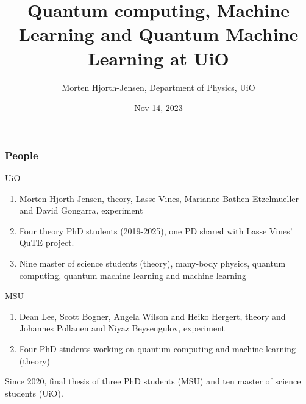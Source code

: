 \documentclass{beamer}
\begin{document}

\newcommand{\exercisesection}[1]{\subsection*{#1}}







\title{Quantum computing, Machine Learning and Quantum Machine Learning at UiO}


\author{Morten Hjorth-Jensen, Department of Physics, UiO\inst{}}
\institute{}

\date{Nov 14, 2023
}

\begin{frame}
\titlepage
\end{frame}

\begin{frame}
\frametitle{People}

\begin{block}{UiO }
\begin{enumerate}
\item Morten Hjorth-Jensen, theory, Lasse Vines, Marianne Bathen Etzelmueller and David Gongarra, experiment

\item Four theory PhD students (2019-2025), one PD shared with Lasse Vines' QuTE project.

\item Nine  master of science students  (theory), many-body physics, quantum computing, quantum machine learning and machine learning
\end{enumerate}

\noindent
\end{block}
\begin{block}{MSU }
\begin{enumerate}
\item Dean Lee, Scott Bogner, Angela Wilson and Heiko Hergert, theory and Johannes Pollanen and Niyaz Beysengulov, experiment

\item Four PhD students working on quantum computing and machine learning (theory)
\end{enumerate}

\noindent
\end{block}
Since 2020, final thesis of three PhD students (MSU) and ten master of science students (UiO).
\end{frame}
\end{document}
